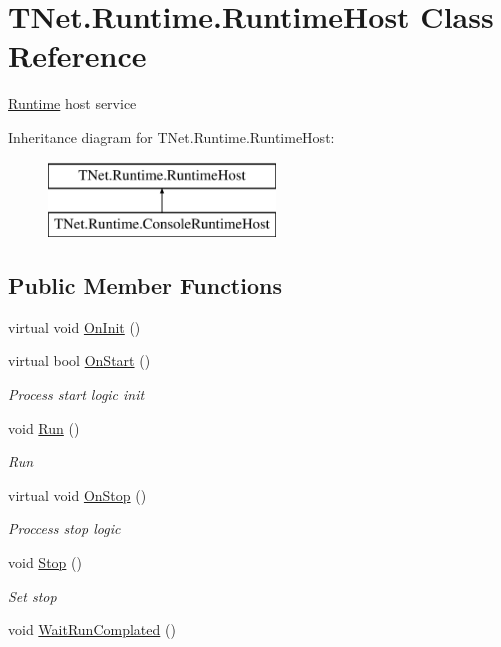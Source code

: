 \hypertarget{class_t_net_1_1_runtime_1_1_runtime_host}{}\section{T\+Net.\+Runtime.\+Runtime\+Host Class Reference}
\label{class_t_net_1_1_runtime_1_1_runtime_host}


\mbox{\hyperlink{namespace_t_net_1_1_runtime}{Runtime}} host service  


Inheritance diagram for T\+Net.\+Runtime.\+Runtime\+Host\+:\begin{figure}[H]
\begin{center}
\leavevmode
\includegraphics[height=2.000000cm]{class_t_net_1_1_runtime_1_1_runtime_host}
\end{center}
\end{figure}
\subsection*{Public Member Functions}
\begin{DoxyCompactItemize}
\item 
virtual void \mbox{\hyperlink{class_t_net_1_1_runtime_1_1_runtime_host_a00be2f1685596dbcdf303ffe409f0655}{On\+Init}} ()
\item 
virtual bool \mbox{\hyperlink{class_t_net_1_1_runtime_1_1_runtime_host_acfc2f1f36f5e2380b6d231ab935db616}{On\+Start}} ()
\begin{DoxyCompactList}\small\item\em Process start logic init \end{DoxyCompactList}\item 
void \mbox{\hyperlink{class_t_net_1_1_runtime_1_1_runtime_host_a8499d71ffc98517e778e43801f68f54f}{Run}} ()
\begin{DoxyCompactList}\small\item\em Run \end{DoxyCompactList}\item 
virtual void \mbox{\hyperlink{class_t_net_1_1_runtime_1_1_runtime_host_ad1e016ede364bf6281d6c663960c3a65}{On\+Stop}} ()
\begin{DoxyCompactList}\small\item\em Proccess stop logic \end{DoxyCompactList}\item 
void \mbox{\hyperlink{class_t_net_1_1_runtime_1_1_runtime_host_aa0892f4222b8136cf59e9c6c9c32ab8f}{Stop}} ()
\begin{DoxyCompactList}\small\item\em Set stop \end{DoxyCompactList}\item 
void \mbox{\hyperlink{class_t_net_1_1_runtime_1_1_runtime_host_a5574eaa4bdb08cbd9ff781f27bfd3664}{Wait\+Run\+Complated}} ()
\end{DoxyCompactItemize}
